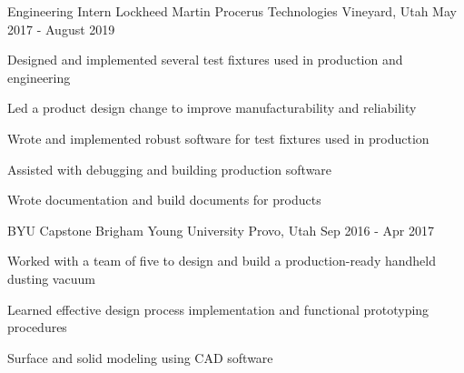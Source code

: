 \begin{cventries}

  \cventry
    {Engineering Intern} %
    {Lockheed Martin Procerus Technologies} %
    {Vineyard, Utah} %
    {May 2017 - August 2019} %
    {
    \begin{cvitems}
      \item{Designed and implemented several test fixtures used in production and engineering}
      \item{Led a product design change to improve manufacturability and reliability}
      \item{Wrote and implemented robust software for test fixtures used in production}
      \item{Assisted with debugging and building production software}
      \item{Wrote documentation and build documents for products}
    \end{cvitems}
    }



  \cventry
    {BYU Capstone} %
    {Brigham Young University} %
    {Provo, Utah} %
    {Sep 2016 - Apr 2017} %
    {
      \begin{cvitems} %
        \item {Worked with a team of five to design and build a production-ready handheld dusting vacuum}
        \item {Learned effective design process implementation and functional prototyping procedures}
        \item {Surface and solid modeling using CAD software}
      \end{cvitems}
    }


\end{cventries}
